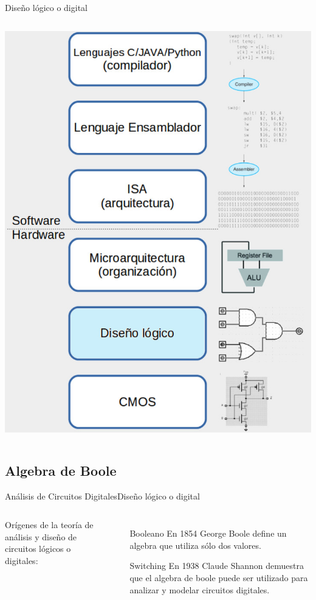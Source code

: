 \documentclass[aspectratio=169,compress]{beamer}
\begin{document}
\begin{footnotesize}
\begin{frame}{Diseño lógico o digital}
\begin{columns}[onlytextwidth,T]
      \column{60mm}
\includegraphics[scale=0.2]{images/abstraccion-logico.jpg} 

    \end{columns}
\end{frame}


\subsection{Algebra de Boole}

\begin{frame}{Análisis de Circuitos Digitales}{Diseño lógico o digital}

\bigskip

 \begin{columns}[onlytextwidth,T]
      \column{\dimexpr\linewidth-60mm-5mm}

Orígenes de la teoría de análisis y diseño de circuitos lógicos
o digitales:
\begin{itemize}
\item[Booleano] En 1854 George Boole define un algebra que utiliza sólo dos valores.
\item[Switching] En 1938 Claude Shannon demuestra que el algebra de boole puede ser utilizado para analizar y modelar circuitos digitales.
\end{itemize}


\end{columns}
\end{frame}
\end{footnotesize}
\end{document}
